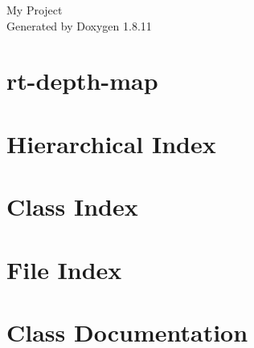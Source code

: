 \documentclass[twoside]{book}
\newcommand{\+}{\discretionary{\mbox{\scriptsize$\hookleftarrow$}}{}{}}
\newcommand{\clearemptydoublepage}{%
  \newpage{\pagestyle{empty}\cleardoublepage}%
}
\begin{document}
\hypersetup{pageanchor=false,
             bookmarksnumbered=true,
             pdfencoding=unicode
            }
\begin{titlepage}
\vspace*{7cm}
\begin{center}%
{\Large My Project }\\
\vspace*{1cm}
{\large Generated by Doxygen 1.8.11}\\
\end{center}
\end{titlepage}
\clearemptydoublepage
\tableofcontents
\clearemptydoublepage
{}
\hypersetup{pageanchor=true}

\chapter{rt-\/depth-\/map}
\label{md_README}
\hypertarget{md_README}{}

\chapter{Hierarchical Index}

\chapter{Class Index}

\chapter{File Index}

\chapter{Class Documentation}
























\end{document}
